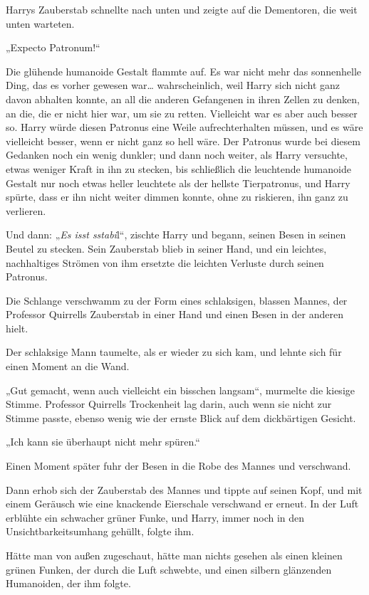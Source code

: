 {Harrys Zauberstab schnellte nach unten und zeigte auf die Dementoren, die weit unten warteten.

„Expecto Patronum!“

Die glühende humanoide Gestalt flammte auf. Es war nicht mehr das sonnenhelle Ding, das es vorher gewesen war… wahrscheinlich, weil Harry sich nicht ganz davon abhalten konnte, an all die anderen Gefangenen in ihren Zellen zu denken, an die, die er nicht hier war, um sie zu retten. Vielleicht war es aber auch besser so. Harry würde diesen Patronus eine Weile aufrechterhalten müssen, und es wäre vielleicht besser, wenn er nicht ganz so hell wäre. Der Patronus wurde bei diesem Gedanken noch ein wenig dunkler; und dann noch weiter, als Harry versuchte, etwas weniger Kraft in ihn zu stecken, bis schließlich die leuchtende humanoide Gestalt nur noch etwas heller leuchtete als der hellste Tierpatronus, und Harry spürte, dass er ihn nicht weiter dimmen konnte, ohne zu riskieren, ihn ganz zu verlieren.

Und dann: „\emph{Es isst sstabi}l“, zischte Harry und begann, seinen Besen in seinen Beutel zu stecken. Sein Zauberstab blieb in seiner Hand, und ein leichtes, nachhaltiges Strömen von ihm ersetzte die leichten Verluste durch seinen Patronus.

Die Schlange verschwamm zu der Form eines schlaksigen, blassen Mannes, der Professor Quirrells Zauberstab in einer Hand und einen Besen in der anderen hielt.

Der schlaksige Mann taumelte, als er wieder zu sich kam, und lehnte sich für einen Moment an die Wand.

„Gut gemacht, wenn auch vielleicht ein bisschen langsam“, murmelte die kiesige Stimme. Professor Quirrells Trockenheit lag darin, auch wenn sie nicht zur Stimme passte, ebenso wenig wie der ernste Blick auf dem dickbärtigen Gesicht.

„Ich kann sie überhaupt nicht mehr spüren.“

Einen Moment später fuhr der Besen in die Robe des Mannes und verschwand.

Dann erhob sich der Zauberstab des Mannes und tippte auf seinen Kopf, und mit einem Geräusch wie eine knackende Eierschale verschwand er erneut. In der Luft erblühte ein schwacher grüner Funke, und Harry, immer noch in den Unsichtbarkeitsumhang gehüllt, folgte ihm.

Hätte man von außen zugeschaut, hätte man nichts gesehen als einen kleinen grünen Funken, der durch die Luft schwebte, und einen silbern glänzenden Humanoiden, der ihm folgte.

}
